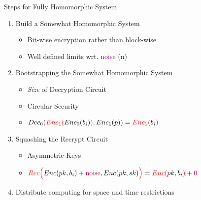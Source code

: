 \documentclass[dvips,11pt]{beamer}
\begin{document}
\begin{frame}{Steps for Fully Homomorphic System}
  \begin{enumerate}
    \item Build a Somewhat Homomorphic System
      \begin{itemize}
        \item Bit-wise encryption rather than block-wise
        \item Well defined limits wrt. \textcolor{purple}{noise} (n)
      \end{itemize}
    \item Bootstrapping the Somewhat Homomorphic System
      \begin{itemize}
        \item {\em Size} of Decryption Circuit
        \item Circular Security
        \item \(
          Dec_0(\textcolor{red}{Enc_1(}Enc_0(b_i)
          \textcolor{red}{)},
          Enc_1(p)
          ) 
          =\textcolor{red}{Enc_1(}b_i\textcolor{red}{)}\)
      \end{itemize}
    \item Squashing the Recrypt Circuit
      \begin{itemize}
        \item Asymmetric Keys 
        \item \(
          \textcolor{red}{Rec\Big(}Enc(pk,b_i)
          +\textcolor{purple}{\text{noise}},Enc(pk,sk)\textcolor{red}{\Big)} 
          =\textcolor{red}{Enc(}pk,b_i\textcolor{red}{)}
          +\textcolor{purple}{\text{0}}\)
      \end{itemize}
    \item Distribute computing for space and time restrictions
  \end{enumerate}
\end{frame}

\end{document}
